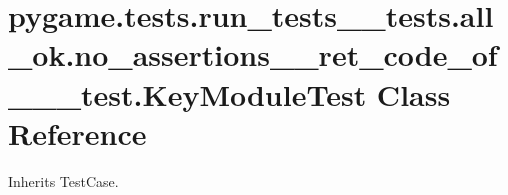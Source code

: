 \hypertarget{classpygame_1_1tests_1_1run__tests____tests_1_1all__ok_1_1no__assertions____ret__code__of__1____test_1_1_key_module_test}{}\section{pygame.\+tests.\+run\+\_\+tests\+\_\+\+\_\+tests.\+all\+\_\+ok.\+no\+\_\+assertions\+\_\+\+\_\+ret\+\_\+code\+\_\+of\+\_\+\_\+\+\_\+test.\+Key\+Module\+Test Class Reference}
\label{classpygame_1_1tests_1_1run__tests____tests_1_1all__ok_1_1no__assertions____ret__code__of__1____test_1_1_key_module_test}


Inherits Test\+Case.

